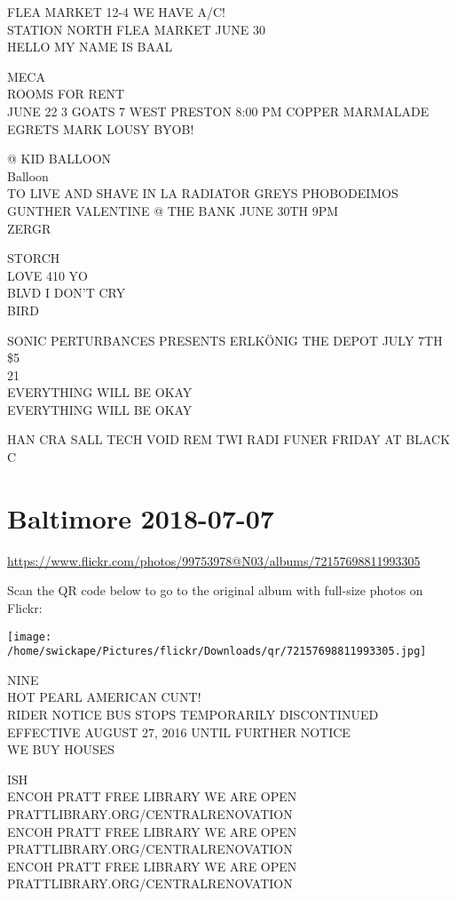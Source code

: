\documentclass[10pt,letterpaper]{article}
\begin{document}
FLEA MARKET 12{-}4 WE HAVE A/C!\\
STATION NORTH FLEA MARKET JUNE 30\\
HELLO MY NAME IS BAAL

MECA\\
ROOMS FOR RENT\\
JUNE 22 3 GOATS 7 WEST PRESTON 8:00 PM COPPER MARMALADE EGRETS MARK LOUSY BYOB!

@ KID BALLOON\\
Balloon\\
TO LIVE AND SHAVE IN LA RADIATOR GREYS PHOBODEIMOS GUNTHER VALENTINE @ THE BANK JUNE 30TH 9PM\\
ZERGR

STORCH\\
LOVE 410 YO\\
BLVD I DON'T CRY\\
BIRD

SONIC PERTURBANCES PRESENTS ERLKÖNIG THE DEPOT JULY 7TH \$5\\
21\\
EVERYTHING WILL BE OKAY\\
EVERYTHING WILL BE OKAY

HAN CRA SALL TECH VOID REM TWI RADI FUNER FRIDAY AT BLACK C


\section*{Baltimore 2018-07-07}

\url{https://www.flickr.com/photos/99753978@N03/albums/72157698811993305}

Scan the QR code below to go to the original album with full-size photos on Flickr:

\texttt{[image: /home/swickape/Pictures/flickr/Downloads/qr/72157698811993305.jpg]}


NINE\\
HOT PEARL AMERICAN CUNT!\\
RIDER NOTICE BUS STOPS TEMPORARILY DISCONTINUED EFFECTIVE AUGUST 27, 2016 UNTIL FURTHER NOTICE\\
WE BUY HOUSES

ISH\\
ENCOH PRATT FREE LIBRARY WE ARE OPEN PRATTLIBRARY.ORG/CENTRALRENOVATION\\
ENCOH PRATT FREE LIBRARY WE ARE OPEN PRATTLIBRARY.ORG/CENTRALRENOVATION\\
ENCOH PRATT FREE LIBRARY WE ARE OPEN PRATTLIBRARY.ORG/CENTRALRENOVATION
\end{document}
